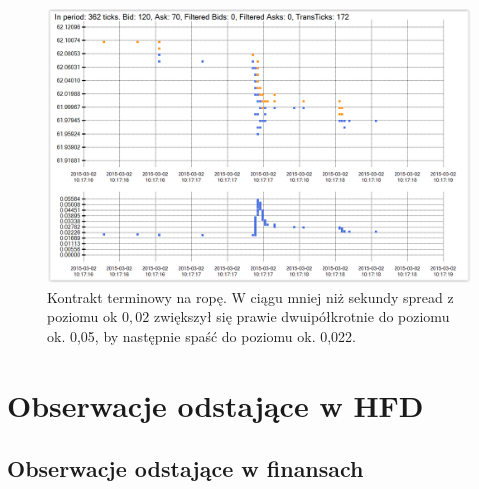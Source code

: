 \documentclass[a4paper,12pt,openany, DIV=calc, headsepline]{scrbook}
\begin{document}
\begin{figure}[H]
  \centering
  \includegraphics[scale=0.5]{wykresy/fBRNJ15Spread.PNG}
  \caption{Kontrakt terminowy na ropę. W ciągu mniej niż sekundy spread z poziomu ok $0,02$ zwiększył się prawie dwuipółkrotnie do poziomu ok. 0,05, by następnie spaść do poziomu ok. 0,022.}
  \label{fig:fBRNJ15Spread}
\end{figure}

\chapter{Obserwacje odstające w HFD}

\section{Obserwacje odstające w finansach}
\end{document}
